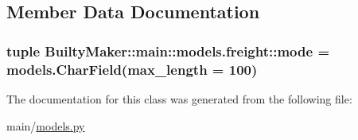 \subsection{\-Member \-Data \-Documentation}
\hypertarget{classBuiltyMaker_1_1main_1_1models_1_1freight_ab0a834439fa17b695406cf37aeece9e3}{
\subsubsection[{mode}]{\setlength{\rightskip}{0pt plus 5cm}tuple {\bf \-Builty\-Maker\-::main\-::models.\-freight\-::mode} = models.\-Char\-Field(max\-\_\-length = 100)}}\label{classBuiltyMaker_1_1main_1_1models_1_1freight_ab0a834439fa17b695406cf37aeece9e3}


\-The documentation for this class was generated from the following file\-:\begin{DoxyCompactItemize}
\item 
main/\hyperlink{models_8py}{models.\-py}\end{DoxyCompactItemize}
